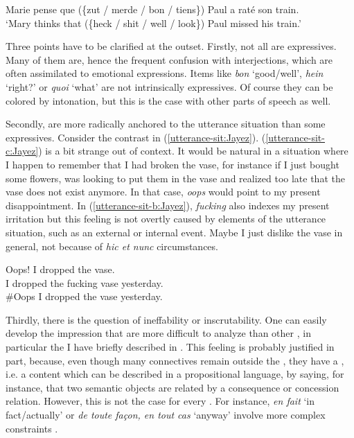 \documentclass[output=paper,colorlinks,citecolor=brown]{langscibook}
\begin{document}
\ea
\label{HNP:Jayez}
Marie pense que (\{zut / merde / bon / tiens\}) Paul {a raté} son train.\\
`Mary thinks that (\{heck / shit / well / look\}) Paul missed his train.'\\
\z

Three points have to be clarified at the outset. Firstly, not all  are expressives. Many of them are, hence the frequent confusion with interjections, which are often assimilated to emotional expressions. Items like \textit{bon} `good/well', \textit{hein} `right?' or \textit{quoi} `what' are not intrinsically expressives. Of course they can be colored by intonation, but this is the case with other parts of speech as well.

Secondly,  are more radically anchored to the utterance situation than some expressives. Consider the contrast in (\ref{utterance-sit:Jayez}). (\ref{utterance-sit-c:Jayez}) is a bit strange out of context. It would be natural in a situation where I happen to remember that I had broken the vase, for instance if I just bought some flowers, was looking to put them in the vase and realized too late that the vase does not exist anymore. In that case, \textit{oops} would point to my present disappointment. In (\ref{utterance-sit-b:Jayez}), \textit{fucking} also indexes my present irritation but this feeling is not overtly caused by elements of the utterance situation, such as an external or internal event. Maybe I just dislike the vase in general, not because of \textit{hic et nunc} circumstances.

\ea
\label{utterance-sit:Jayez}
\ea \label{utterance-sit-a:Jayez}
Oops! I dropped the vase.\\
\ex \label{utterance-sit-b:Jayez}
I dropped the fucking vase yesterday.\\
\ex \label{utterance-sit-c:Jayez}
\#Oops I dropped the vase yesterday.\\
\z
\z

Thirdly, there is the question of ineffability or inscrutability.  One can easily develop the impression that  are more difficult to analyze than other , in particular the   I have briefly described in . This feeling is probably justified in part, because, even though many connectives remain outside the , they have a , i.e. a content which can be described in a propositional language, by saying, for instance, that two semantic objects are related by a consequence or concession relation. However, this is not the case for every . For instance, \textit{en fait} `in fact/actually' or \textit{de toute façon, en tout cas} `anyway' involve more complex constraints \citep{Rossarietal:2018}.
\end{document}
